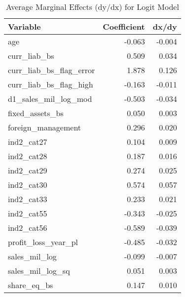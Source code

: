 \begin{table}

\caption{\label{tab:unnamed-chunk-14}Average Marginal Effects (dy/dx) for Logit Model}
\centering
\begin{tabular}[t]{l|r|r}
\hline
Variable & Coefficient & dx/dy\\
\hline
age & -0.063 & -0.004\\
\hline
curr\_liab\_bs & 0.509 & 0.034\\
\hline
curr\_liab\_bs\_flag\_error & 1.878 & 0.126\\
\hline
curr\_liab\_bs\_flag\_high & -0.163 & -0.011\\
\hline
d1\_sales\_mil\_log\_mod & -0.503 & -0.034\\
\hline
fixed\_assets\_bs & 0.050 & 0.003\\
\hline
foreign\_management & 0.296 & 0.020\\
\hline
ind2\_cat27 & 0.104 & 0.009\\
\hline
ind2\_cat28 & 0.187 & 0.016\\
\hline
ind2\_cat29 & 0.274 & 0.025\\
\hline
ind2\_cat30 & 0.574 & 0.057\\
\hline
ind2\_cat33 & 0.233 & 0.021\\
\hline
ind2\_cat55 & -0.343 & -0.025\\
\hline
ind2\_cat56 & -0.589 & -0.039\\
\hline
profit\_loss\_year\_pl & -0.485 & -0.032\\
\hline
sales\_mil\_log & -0.099 & -0.007\\
\hline
sales\_mil\_log\_sq & 0.051 & 0.003\\
\hline
share\_eq\_bs & 0.147 & 0.010\\
\hline
\end{tabular}
\end{table}